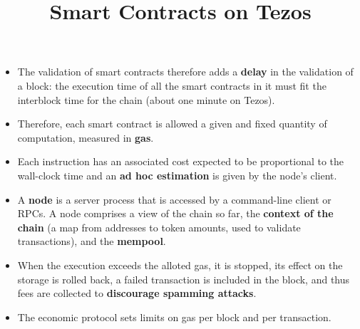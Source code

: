 \documentclass[wide]{slides}
\begin{document}
\begin{slide}
  \title{Smart Contracts on Tezos}

  \begin{itemize}

    \item The validation of smart contracts therefore adds a
      \textbf{delay} in the validation of a block: the execution time of
      all the smart contracts in it must fit the interblock time for
      the chain (about one minute on Tezos).

    \item Therefore, each smart contract is allowed a given and fixed
      quantity of computation, measured in \textbf{gas}.

    \item Each instruction has an associated cost expected to be
      proportional to the wall-clock time and an \textbf{ad hoc
        estimation} is given by the node's client.

    \item A \textbf{node} is a server process that is accessed by a
      command-line client or RPCs. A node comprises a view of the
      chain so far, the \textbf{context of the chain} (a map from
      addresses to token amounts, used to validate transactions), and
      the \textbf{mempool}.

    \item When the execution exceeds the alloted gas, it is stopped,
      its effect on the storage is rolled back, a failed transaction
      is included in the block, and thus fees are collected to
      \textbf{discourage spamming attacks}.

    \item The economic protocol sets limits on gas per block and per
      transaction.

  \end{itemize}

\end{slide}
\end{document}
